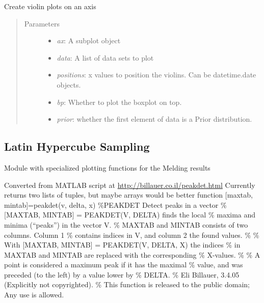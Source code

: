 \documentclass[a4paper,10pt,english]{sphinxmanual}
\begin{document}
\begin{fulllineitems}
\label{BIP.Bayes:BIP.Bayes.PlotMeld.violin_plot}
Create violin plots on an axis
\begin{quote}\begin{description}
\item[{Parameters}] \leavevmode\begin{itemize}
\item {} 
\emph{ax}: A subplot object

\item {} 
\emph{data}: A list of data sets to plot

\item {} 
\emph{positions}: x values to position the violins. Can be datetime.date objects.

\item {} 
\emph{bp}: Whether to plot the boxplot on top.

\item {} 
\emph{prior}: whether the first element of data is a Prior distribution.

\end{itemize}

\end{description}\end{quote}

\end{fulllineitems}



\subsection{Latin Hypercube Sampling}
\label{BIP.Bayes:module-BIP.Bayes.PlotMeld}\label{BIP.Bayes:latin-hypercube-sampling}
Module with specialized plotting functions for the Melding results

\begin{fulllineitems}
Converted from MATLAB script at \href{http://billauer.co.il/peakdet.html}{http://billauer.co.il/peakdet.html}
Currently returns two lists of tuples, but maybe arrays would be better
function {[}maxtab, mintab{]}=peakdet(v, delta, x)
\%PEAKDET Detect peaks in a vector
\% {[}MAXTAB, MINTAB{]} = PEAKDET(V, DELTA) finds the local
\% maxima and minima (``peaks'') in the vector V.
\% MAXTAB and MINTAB consists of two columns. Column 1
\% contains indices in V, and column 2 the found values.
\%
\% With {[}MAXTAB, MINTAB{]} = PEAKDET(V, DELTA, X) the indices
\% in MAXTAB and MINTAB are replaced with the corresponding
\% X-values.
\%
\% A point is considered a maximum peak if it has the maximal
\% value, and was preceded (to the left) by a value lower by
\% DELTA.
\% Eli Billauer, 3.4.05 (Explicitly not copyrighted).
\% This function is released to the public domain; Any use is allowed.

\end{fulllineitems}
\end{document}

